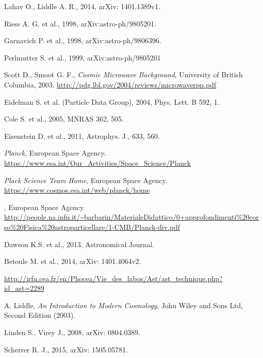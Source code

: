 \documentclass[onecolumn,           %
               showpacs,            %
               preprintnumbers,     %
               aps,                 %
               prl,          	    %
               letterpaper,             %
               superscriptaddress,      %
               nofootinbib,         %
               tightenlines,        %
               floats,floatfix      %
               ,usenatbib,
               ]{revtex4-1}
\begin{document}
\begin{thebibliography}{9}
 Lahav O., Liddle A. R., 2014, arXiv: 1401.1389v1.

 Riess A. G. et al., 1998, 	arXiv:astro-ph/9805201.

 Garnavich P. et al., 1998, arXiv:astro-ph/9806396. 

 Perlmutter S. et al., 1999, arXiv:astro-ph/9805201

 Scott D.,  Smoot G. F., {\em Cosmic Microwave Background}, University of British Columbia, 2003. \url{http://pdg.lbl.gov/2004/reviews/microwaverpp.pdf} 

 Eidelman S. et al. (Particle Data Group), 2004, Phys. Lett. B 592, 1.

 Cole S. et al., 2005, MNRAS 362, 505.

 Eisenstein D. et al., 2011, Astrophys. J., 633, 560.

 {\em Planck}, European Space Agency. \url{https://www.esa.int/Our_Activities/Space_Science/Planck}

 {\em Plack Science Team Home}, European Space Agency. \url{https://www.cosmos.esa.int/web/planck/home}

, European Space Agency. \url{http://people.na.infn.it/~barbarin/MaterialeDidattico/0+approfondimenti%20corso%20Fisica%20astroparticellare/1-CMB/Planck-div.pdf}
	
 Dawson K.S. et al., 2013, Astronomical Journal.

 Betoule M. et al., 2014, arXiv: 1401.4064v2.

 \url{http://irfu.cea.fr/en/Phocea/Vie_des_labos/Ast/ast_technique.php?id_ast=2289}

 A. Liddle, {\em An Introduction to Modern Cosmology}, John Wiley and Sons Ltd, Second Edition (2003).

 Linden S., Virey J., 2008, arXiv: 0804.0389.

 Scherrer R. J., 2015, arXiv: 1505.05781.

\end{thebibliography}
\end{document}
